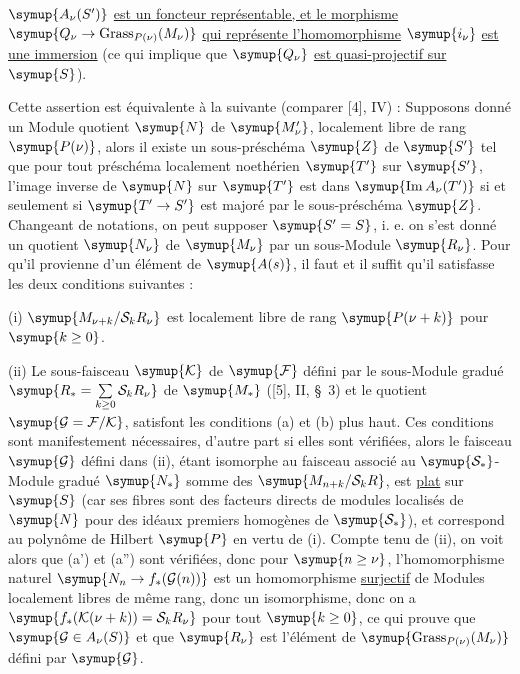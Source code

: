  $\symup{A_\nu(S')}$ \uline{est un foncteur représentable, et le morphisme}
$\symup{Q_\nu\to\operatorname{Grass}_{P(\nu)}(M_\nu)}$ \uline{qui représente
l'homomorphisme} $\symup{i_\nu}$ \uline{est une immersion} (ce qui implique que $\symup{Q_\nu}$ \uline{est
quasi-projectif sur} $\symup{S}$).

Cette assertion est équivalente à la suivante (comparer [4], IV) : Supposons
donné un Module quotient $\symup{N}$ de $\symup{M'_\nu}$, localement libre de rang $\symup{P(\nu)}$,
alors il existe un sous-préschéma $\symup{Z}$ de $\symup{S'}$ tel que pour tout préschéma
localement noethérien $\symup{T'}$
sur $\symup{S'}$, l'image inverse de $\symup{N}$ sur $\symup{T'}$ est dans
$\symup{\operatorname{Im}A_\nu(T')}$ si et seulement si $\symup{T'\to S'}$ est
majoré par le sous-préschéma $\symup{Z}$. Changeant de notations, on peut supposer
$\symup{S'=S}$, i. e. on s'est donné un quotient $\symup{N_\nu}$ de $\symup{M_\nu}$ par un sous-Module
$\symup{R_\nu}$. Pour qu'il provienne d'un élément de $\symup{A(s)}$, il faut et il suffit
qu'il satisfasse les deux conditions suivantes :

\medskip
\noindent (i) $\symup{M_{\nu+k}/\mathcal S_kR_\nu}$ est localement libre de rang
$\symup{P(\nu+k)}$ pour $\symup{k\geq0}$.

\smallskip
\noindent (ii) Le sous-faisceau $\symup{\mathcal K}$ de $\symup{\mathcal F}$ défini par le
sous-Module gradué
$\symup{R_* =\sum\limits_{k\geq0}\mathcal S_kR_\nu}$
de $\symup{M_*}$ ([5], II, \S~3) et le quotient $\symup{\mathcal G=\mathcal F/\mathcal K}$,
satisfont les conditions (a) et (b) plus haut. Ces conditions sont manifestement nécessaires, d'autre part si elles sont
vérifiées, alors le faisceau $\symup{\mathcal G}$ défini dans (ii), étant isomorphe au
faisceau associé au $\symup{\mathcal S_*}$-Module gradué $\symup{N_*}$ somme des
$\symup{M_{n+k}/\mathcal S_kR}$, est \uline{plat} sur $\symup{S}$ (car ses fibres sont des
facteurs directs de modules localisés de $\symup{N}$ pour des idéaux premiers homogènes
de $\symup{\mathcal S_*}$), et correspond au polynôme de Hilbert $\symup{P}$ en vertu de (i).
Compte tenu de (ii), on voit alors que (a') et (a'') sont vérifiées, donc pour
$\symup{n\geq\nu}$, l'homomorphisme naturel
$\symup{N_n\to f_*(\mathcal G(n))}$ est un homomorphisme \uline{surjectif} de
Modules localement libres de même rang, donc un isomorphisme, donc on a
$\symup{f_*(\mathcal K(\nu+k))=\mathcal S_kR_\nu}$ pour tout $\symup{k\geq0}$,
ce qui prouve que $\symup{\mathcal G\in A_\nu(S)}$ et que $\symup{R_\nu}$ est l'élément de
$\symup{\operatorname{Grass}_{P(\nu)}(M_\nu)}$ défini par $\symup{\mathcal G}$.

